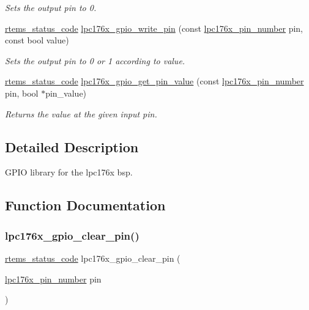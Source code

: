 \begin{DoxyCompactItemize}
\begin{DoxyCompactList}\small\item\em Sets the output pin to 0. \end{DoxyCompactList}\item 
\mbox{\hyperlink{group__ClassicStatus_ga545d41846817eaba6143d52ee4d9e9fe}{rtems\+\_\+status\+\_\+code}} \mbox{\hyperlink{lpc-gpio_8c_a8aa6fe8e8aac1e5ba18c0a90b2c61c97}{lpc176x\+\_\+gpio\+\_\+write\+\_\+pin}} (const \mbox{\hyperlink{common-types_8h_a8215ced1557c43bc5925b691a3c1dc23}{lpc176x\+\_\+pin\+\_\+number}} pin, const bool value)
\begin{DoxyCompactList}\small\item\em Sets the output pin to 0 or 1 according to value. \end{DoxyCompactList}\item 
\mbox{\hyperlink{group__ClassicStatus_ga545d41846817eaba6143d52ee4d9e9fe}{rtems\+\_\+status\+\_\+code}} \mbox{\hyperlink{lpc-gpio_8c_ab51cfd202c57128af7db6ce1927ab4a5}{lpc176x\+\_\+gpio\+\_\+get\+\_\+pin\+\_\+value}} (const \mbox{\hyperlink{common-types_8h_a8215ced1557c43bc5925b691a3c1dc23}{lpc176x\+\_\+pin\+\_\+number}} pin, bool $\ast$pin\+\_\+value)
\begin{DoxyCompactList}\small\item\em Returns the value at the given input pin. \end{DoxyCompactList}\end{DoxyCompactItemize}


\subsection{Detailed Description}
G\+P\+IO library for the lpc176x bsp. 



\subsection{Function Documentation}
\mbox{\label{lpc-gpio_8c_a5bae3a3990dd0e2fe8769c2221130c70}} 
\subsubsection{\texorpdfstring{lpc176x\_gpio\_clear\_pin()}{lpc176x\_gpio\_clear\_pin()}}
{\footnotesize\ttfamily \mbox{\hyperlink{group__ClassicStatus_ga545d41846817eaba6143d52ee4d9e9fe}{rtems\+\_\+status\+\_\+code}} lpc176x\+\_\+gpio\+\_\+clear\+\_\+pin (\begin{DoxyParamCaption}\item[{\mbox{\hyperlink{common-types_8h_a8215ced1557c43bc5925b691a3c1dc23}{lpc176x\+\_\+pin\+\_\+number}}}]{pin }\end{DoxyParamCaption})}



